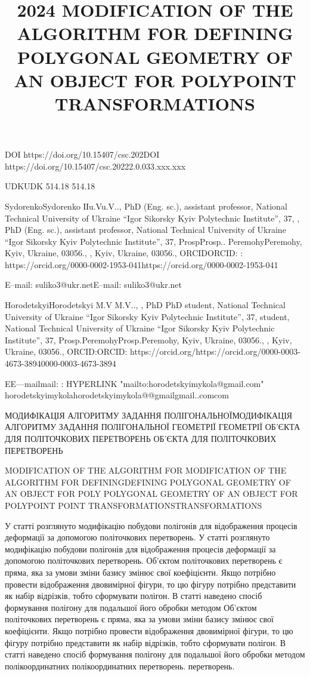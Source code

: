 \documentclass[12pt,a4paper]{article}
\begin{document}
\title{2024 MODIFICATION OF THE ALGORITHM FOR DEFINING POLYGONAL GEOMETRY OF AN OBJECT FOR POLYPOINT TRANSFORMATIONS}
\maketitle
DOI https://doi.org/10.15407/csc.202DOI https://doi.org/10.15407/csc.20222.0.033.xxx.xxx
\par
UDKUDK 514.18  514.18
\par
SydorenkoSydorenko  ІІu.Vu.V.., PhD (Eng. sc.), assistant professor, National Technical University of Ukraine “Igor Sikorsky Kyiv Polytechnic Institute”, 37, , PhD (Eng. sc.), assistant professor, National Technical University of Ukraine “Igor Sikorsky Kyiv Polytechnic Institute”, 37, ProspProsp..  PeremohyPeremohy, Kyiv, Ukraine, 03056., , Kyiv, Ukraine, 03056., ORCIDORCID: : https://orcid.org/0000-0002-1953-041https://orcid.org/0000-0002-1953-041
\par
E–mail: suliko3@ukr.netE–mail: suliko3@ukr.net
\par
HorodetskyiHorodetskyi M.V M.V.., , PhD PhD student, National Technical University of Ukraine “Igor Sikorsky Kyiv Polytechnic Institute”, 37, student, National Technical University of Ukraine “Igor Sikorsky Kyiv Polytechnic Institute”, 37, Prosp.PeremohyProsp.Peremohy, Kyiv, Ukraine, 03056., , Kyiv, Ukraine, 03056., ORCID:ORCID:  https://orcid.org/https://orcid.org/0000-0003-4673-38940000-0003-4673-3894
\par
EE––mailmail: :  HYPERLINK "mailto:horodetskyimykola@gmail.com" horodetskyimykolahorodetskyimykola@@gmailgmail..comcom
\par
МОДИФІКАЦІЯ АЛГОРИТМУ ЗАДАННЯ ПОЛІГОНАЛЬНОЇМОДИФІКАЦІЯ АЛГОРИТМУ ЗАДАННЯ ПОЛІГОНАЛЬНОЇ ГЕОМЕТРІЇ ГЕОМЕТРІЇ ОБ’ЄКТА ДЛЯ ПОЛІТОЧКОВИХ ПЕРЕТВОРЕНЬ ОБ’ЄКТА ДЛЯ ПОЛІТОЧКОВИХ ПЕРЕТВОРЕНЬ
\par
MODIFICATION OF THE ALGORITHM FOR MODIFICATION OF THE ALGORITHM FOR DEFININGDEFINING POLYGONAL GEOMETRY OF AN OBJECT FOR POLY POLYGONAL GEOMETRY OF AN OBJECT FOR POLYPOINT POINT TRANSFORMATIONSTRANSFORMATIONS
\par
У статті розглянуто модифікацію побудови полігонів для відображення процесів деформації за допомогою політочкових перетворень. У статті розглянуто модифікацію побудови полігонів для відображення процесів деформації за допомогою політочкових перетворень. Об’єктом політочкових перетворень є пряма, яка  за умови зміни базису змінює свої коефіцієнти. Якщо потрібно провести відображення двовимірної фігури, то цю фігуру потрібно представити як набір відрізків, тобто сформувати полігон. В статті наведено спосіб формування полігону для подальшої його обробки методом Об’єктом політочкових перетворень є пряма, яка  за умови зміни базису змінює свої коефіцієнти. Якщо потрібно провести відображення двовимірної фігури, то цю фігуру потрібно представити як набір відрізків, тобто сформувати полігон. В статті наведено спосіб формування полігону для подальшої його обробки методом полікоординатних полікоординатних перетворень. перетворень.
\end{document}
